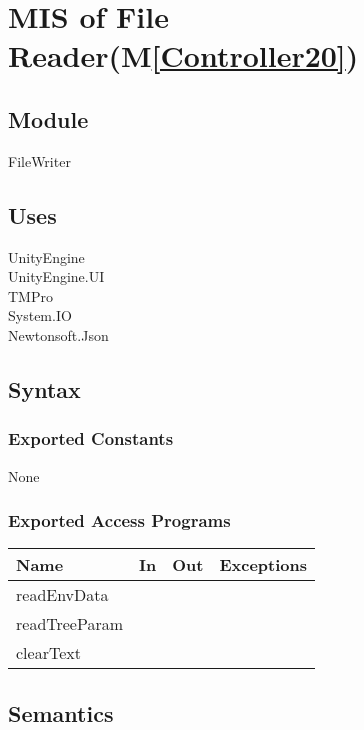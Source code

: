 \documentclass[12pt, titlepage]{article}
\newcommand{\mref}[1]{M\ref{#1}}
\begin{document}

\newpage


\section{MIS of File Reader(\mref{Controller20})}  

\subsection{Module}

FileWriter

\subsection{Uses}
UnityEngine\\
UnityEngine.UI\\
TMPro\\
System.IO\\
Newtonsoft.Json\\

\subsection{Syntax}
\subsubsection{Exported Constants}
None
\subsubsection{Exported Access Programs}

\begin{center}
\begin{tabular}{| l | l | l | p{5cm}|}
\hline
\textbf{Name} & \textbf{In} & \textbf{Out} & \textbf{Exceptions} \\
\hline
readEnvData &  &  &  \\
\hline
readTreeParam &  & & \\
\hline
clearText &&&\\
\hline
\end{tabular}
\end{center}

\subsection{Semantics}
\end{document}
